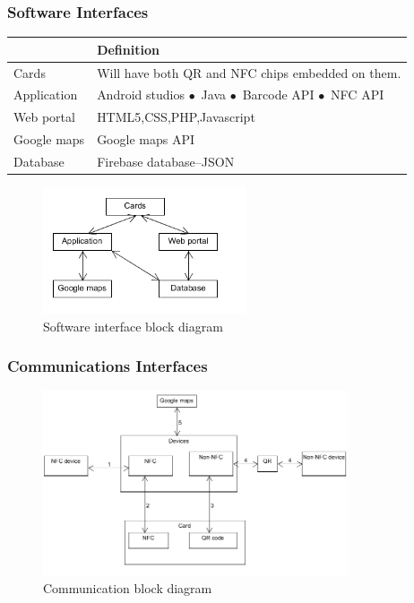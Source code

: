 \documentclass[english]{article}
\begin{document}
				   
				\subsubsection{Software Interfaces}


\begin{tabular}{ |p{3cm}|p{9cm}|  }
				\hline
				\textbf{} & \textbf{Definition}\\
				\hline
				Cards & Will have both QR and NFC chips embedded on them.\\
				\hline
				Application & Android studios
$\bullet$\ Java
$\bullet$\ Barcode API
$\bullet$\ NFC API
\\
				\hline
				 Web portal & HTML5,CSS,PHP,Javascript\\
				
				\hline
				 Google maps & Google maps API\\
				\hline
				 Database & Firebase database–JSON\\
				\hline
				
				\end{tabular}
\begin{figure}[ht!]
\centering
\includegraphics[width=60mm]{Software.png}
\caption{Software interface block diagram}
\end{figure}
			
					
\subsubsection{Communications Interfaces}

\begin{figure}[ht!]
\centering
\includegraphics[width=90mm]{communication.png}
\caption{Communication block diagram }
\end{figure}
\end{document}
